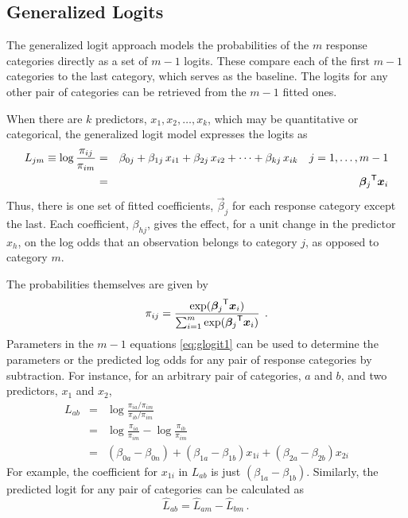 \subsection{Generalized Logits}\label{sec:genlogit}

The generalized logit approach models the probabilities of the $m$ response categories directly as a set of \(m - 1\) logits.  These compare
each of the first \(m - 1\) categories to the last category, which serves
as the baseline.
The logits for any other pair of categories can be retrieved
from the \(m - 1\) fitted ones.

When there are $k$ predictors, \(x_1, x_2, \dots , x_k\),
which may be quantitative or categorical, the generalized logit
model expresses the logits as
\begin{eqnarray}\label{eq:glogit1}
  L_{jm}  \equiv
    \log \frac{\pi_{ij}}{\pi_{im}} & = & \beta_{0j}  +
  \beta _{1j} \,  x_{i1}  +
  \beta _{2j} \,  x_{i2}  + \cdots +
  \beta _{kj} \,  x_{ik} \quad
   j=1, \dots , m-1 \nonumber \\
  & = & {\bm{\beta}_j} ^\mathsf{T} \bm{x}_i
\end{eqnarray}
Thus, there is one set of fitted coefficients, $\vec{\beta}_j$ for each
response category except the last.
Each coefficient, $\beta_{hj}$, gives the effect,
for a unit change in the predictor $x_h$,
on the log odds
that an observation belongs to category $j$, as opposed to category $m$.

The probabilities themselves are given by
\begin{equation*}
\pi_{ij} =
 \frac{ \exp ( {\bm{\beta}_j} ^\mathsf{T} \bm{x}_i ) }
      { \sum_{i=1}^m \exp ( {\bm{\beta}_j} ^\mathsf{T} \bm{x}_i ) }
 \:\: .
\end{equation*}
Parameters in the $m-1$ equations \eqref{eq:glogit1} can be used to determine the
parameters or the predicted log odds for any pair of response categories
by subtraction.
For instance, for an arbitrary pair of categories, $a$ and $b$,
and two predictors, $x_1$ and $x_2$,
\begin{eqnarray*}%
  L_{ab} & = & \log \frac{\pi_{ia}/\pi_{im}}{\pi_{ib}/\pi_{im}} \\
         & = & \log \frac{\pi_{ia}}{\pi_{im}} - \log \frac{\pi_{ib}}{\pi_{im}} \\
            & = & (\beta_{0a}-\beta_{0n}) + (\beta_{1a}-\beta_{1b}) x_{1i}
            + (\beta_{2a}-\beta_{2b}) x_{2i} 
\end{eqnarray*}
For example, the coefficient for $x_{1i}$ in $ L_{ab}$
is just $(\beta_{1a}-\beta_{1b})$.
Similarly, the predicted logit for any pair of categories
can be calculated as
\begin{equation*}
 \hat{L}_{ab} = \hat{L}_{am} - \hat{L}_{bm}
 \period
\end{equation*}

